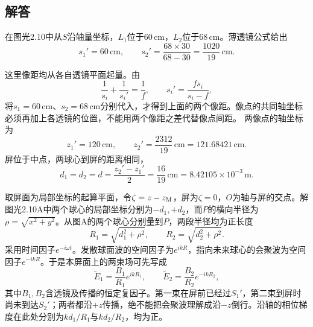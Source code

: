 \documentclass[UTF8,fontset=fandol,a4paper,11pt]{ctexart}
\newcommand{\figcaption}[1]{\par\vspace{2pt}{\small\color{muted}#1}\par}
\begin{document}
\subsection*{解答}


在图光2.10中从$S$沿轴量坐标，$L_1$位于$60\,\mathrm{cm}$，$L_2$位于$68\,\mathrm{cm}$。薄透镜公式给出
\[
s_1'=60\,\mathrm{cm},\qquad
s_2'=\frac{68\times30}{68-30}=\frac{1020}{19}\,\mathrm{cm}.
\]

这里像距均从各自透镜平面起量。由
\[
\frac1{s_i}+\frac1{s_i'}=\frac1f,\qquad
s_i'=\frac{fs_i}{s_i-f},
\]
将$s_1=60\,\mathrm{cm}$、$s_2=68\,\mathrm{cm}$分别代入，才得到上面的两个像距。像点的共同轴坐标必须再加上各透镜的位置，不能用两个像距之差代替像点间距。
两像点的轴坐标为
\[
z_1'=120\,\mathrm{cm},\qquad
z_2'=\frac{2312}{19}\,\mathrm{cm}=121.68421\,\mathrm{cm}.
\]
屏位于中点，两球心到屏的距离相同，
\[
d_1=d_2=d=\frac{z_2'-z_1'}2=\frac{16}{19}\,\mathrm{cm}
=8.42105\times10^{-3}\,\mathrm m.
\]
\begin{center}\begin{minipage}{.98\linewidth}\centering
{}
\figcaption{解图光2.10A\quad 同一点上的两束传播方向与曲率符号}
\end{minipage}\end{center}

取屏面为局部坐标的起算平面，令$\zeta=z-z_{\rm M}$，屏为$\zeta=0$，$O$为轴与屏的交点。解图光2.10A中两个球心的局部坐标分别为$-d_1,+d_2$，而$P$的横向半径为$\rho=\sqrt{x^2+y^2}$。从图A的两个球心分别量到$P$，两段半径均为正长度
\[
R_1=\sqrt{d_1^2+\rho^2},\qquad
R_2=\sqrt{d_2^2+\rho^2}.
\]
采用时间因子$e^{-i\omega t}$。发散球面波的空间因子为$e^{ikR}$，指向未来球心的会聚波为空间因子$e^{-ikR}$。于是本屏面上的两束场可先写成
\[
\widetilde E_1=\frac{B_1}{R_1}e^{ikR_1},\qquad
\widetilde E_2=\frac{B_2}{R_2}e^{-ikR_2},
\]
其中$B_1,B_2$含透镜及传播的恒定复因子。第一束在屏前已经过$S_1'$，第二束到屏时尚未到达$S_2'$；两者都沿$+z$传播，绝不能把会聚波理解成沿$-z$倒行。沿轴的相位梯度在此处分别为$kd_1/R_1$与$kd_2/R_2$，均为正。
\end{document}

